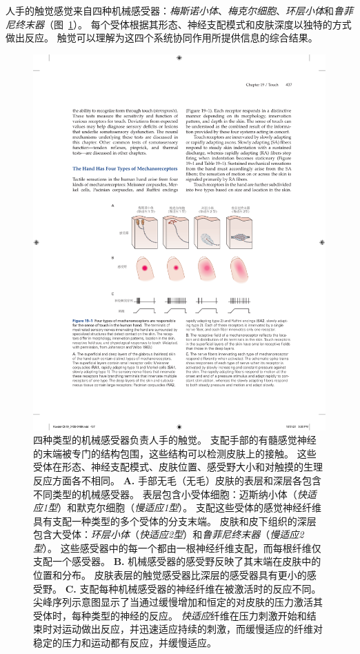 人手的触觉感觉来自四种机械感受器：\textit{梅斯诺小体}、\textit{梅克尔细胞}、\textit{环层小体}和\textit{鲁菲尼终末器}（图~\ref{fig:19_1}）。
每个受体根据其形态、神经支配模式和皮肤深度以独特的方式做出反应。
触觉可以理解为这四个系统协同作用所提供信息的综合结果。


\begin{figure}[htbp]
	\centering
	\includegraphics[width=0.95\linewidth]{chap19/fig_19_1}
	\caption{四种类型的机械感受器负责人手的触觉。
		支配手部的有髓感觉神经的末端被专门的结构包围，这些结构可以检测皮肤上的接触。
		这些受体在形态、神经支配模式、皮肤位置、感受野大小和对触摸的生理反应方面各不相同\cite{johansson1983tactile}。
		\textbf{A.} 手部无毛（无毛）皮肤的表层和深层各包含不同类型的机械感受器。
		表层包含小受体细胞：迈斯纳小体（\textit{快适应1型}）和默克尔细胞（\textit{慢适应1型}）。
		支配这些受体的感觉神经纤维具有支配一种类型的多个受体的分支末端。
		皮肤和皮下组织的深层包含大受体：\textit{环层小体}（\textit{快适应2型}）和\textit{鲁菲尼终末器}（\textit{慢适应2型}）。
		这些感受器中的每一个都由一根神经纤维支配，而每根纤维仅支配一个感受器。
		\textbf{B.} 机械感受器的感受野反映了其末端在皮肤中的位置和分布。
		皮肤表层的触觉感受器比深层的感受器具有更小的感受野。
		\textbf{C.} 支配每种机械感受器的神经纤维在被激活时的反应不同。
		尖峰序列示意图显示了当通过缓慢增加和恒定的对皮肤的压力激活其受体时，每种类型的神经的反应。
		\textit{快适应}纤维在压力刺激开始和结束时对运动做出反应，并迅速适应持续的刺激，而缓慢适应的纤维对稳定的压力和运动都有反应，并缓慢适应。}
	\label{fig:19_1}
\end{figure}


